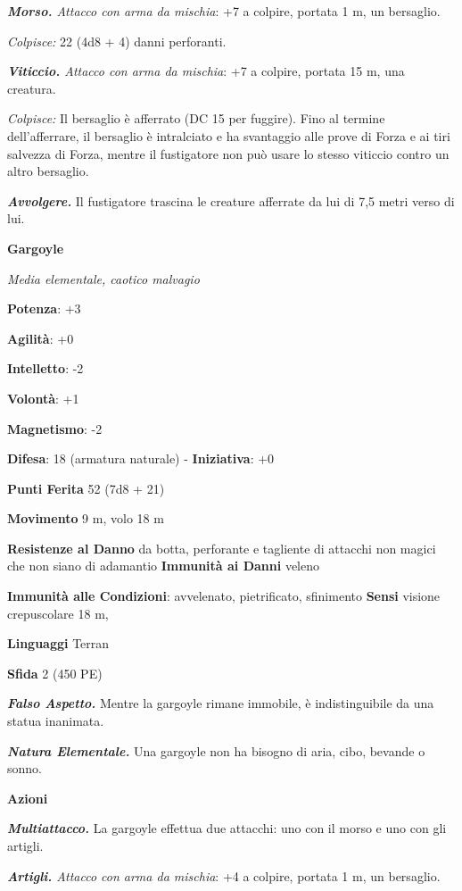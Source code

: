 \begin{multicols}{2}
\emph{\textbf{Morso.} Attacco con arma da mischia}: +7 a colpire,
portata 1 m, un bersaglio.

\emph{Colpisce:} 22 (4d8 + 4) danni perforanti.

\emph{\textbf{Viticcio.} Attacco con arma da mischia}: +7 a colpire,
portata 15 m, una creatura.

\emph{Colpisce:} Il bersaglio è afferrato (DC 15 per fuggire). Fino al
termine dell'afferrare, il bersaglio è intralciato e ha svantaggio alle
prove di Forza e ai tiri salvezza di Forza, mentre il fustigatore non
può usare lo stesso viticcio contro un altro bersaglio.

\emph{\textbf{Avvolgere.}} Il fustigatore trascina le creature afferrate
da lui di 7,5 metri verso di lui.

\textbf{Gargoyle}

\emph{Media elementale, caotico malvagio}

\textbf{Potenza}: +3

\textbf{Agilità}: +0

\textbf{Intelletto}: -2

\textbf{Volontà}: +1

\textbf{Magnetismo}: -2

\textbf{Difesa}: 18 (armatura naturale) - \textbf{Iniziativa}: +0

\textbf{Punti Ferita} 52 (7d8 + 21)

\textbf{Movimento} 9 m, volo 18 m

\textbf{Resistenze al Danno} da botta, perforante e tagliente di
attacchi non magici che non siano di adamantio \textbf{Immunità ai
Danni} veleno

\textbf{Immunità alle Condizioni}: avvelenato, pietrificato, sfinimento
\textbf{Sensi} visione crepuscolare 18 m, 

\textbf{Linguaggi} Terran

\textbf{Sfida} 2 (450 PE)\smallskip

\emph{\textbf{Falso Aspetto.}} Mentre la gargoyle rimane immobile, è
indistinguibile da una statua inanimata.

\emph{\textbf{Natura Elementale.}} Una gargoyle non ha bisogno di aria,
cibo, bevande o sonno.

\smallskip\textbf{Azioni}

\emph{\textbf{Multiattacco.}} La gargoyle effettua due attacchi: uno con
il morso e uno con gli artigli.

\emph{\textbf{Artigli.} Attacco con arma da mischia}: +4 a colpire,
portata 1 m, un bersaglio.


\end{multicols}
